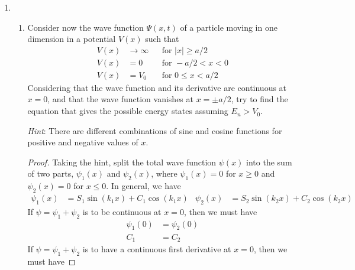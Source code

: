 \documentclass[../psets.tex]{subfiles}
\begin{document}
\begin{enumerate}
\begin{enumerate}
\begin{proof}
            If we replace $\psi_3$ by $\psi_2$, then $\psi(x,t)$ will have no definite parity (will be neither even nor odd). Thus, the left integral in part (d) will no longer vanish generically; instead, it will be some function of time. This will also affect the momentum result since it follows from the position result. So overall,  the result will be different.
        \end{proof}
    \end{enumerate}
    \pagebreak
    \item 
    \begin{enumerate}
        \item Consider now the wave function $\Psi(x,t)$ of a particle moving in one dimension in a potential $V(x)$ such that
        \begin{equation}
            \begin{aligned}
                V(x) &\to\infty && \text{for }|x|\geq a/2\\
                V(x) &= 0       && \text{for }-a/2<x<0\\
                V(x) &= V_0     && \text{for }0\leq x<a/2
            \end{aligned}
        \end{equation}
        Considering that the wave function and its derivative are continuous at $x=0$, and that the wave function vanishes at $x=\pm a/2$, try to find the equation that gives the possible energy states assuming $E_n>V_0$.\par
        \emph{Hint}: There are different combinations of sine and cosine functions for positive and negative values of $x$.
        \begin{proof}
            Taking the hint, split the total wave function $\psi(x)$ into the sum of two parts, $\psi_1(x)$ and $\psi_2(x)$, where $\psi_1(x)=0$ for $x\geq 0$ and $\psi_2(x)=0$ for $x\leq 0$. In general, we have
            \begin{align*}
                \psi_1(x) &= S_1\sin(k_1x)+C_1\cos(k_1x)&
                \psi_2(x) &= S_2\sin(k_2x)+C_2\cos(k_2x)
            \end{align*}
            If $\psi=\psi_1+\psi_2$ is to be continuous at $x=0$, then we must have
            \begin{align*}
                \psi_1(0) &= \psi_2(0)\\
                C_1 &= C_2
            \end{align*}
            If $\psi=\psi_1+\psi_2$ is to have a continuous first derivative at $x=0$, then we must have

\end{proof}
\end{enumerate}
\end{enumerate}
\end{document}

